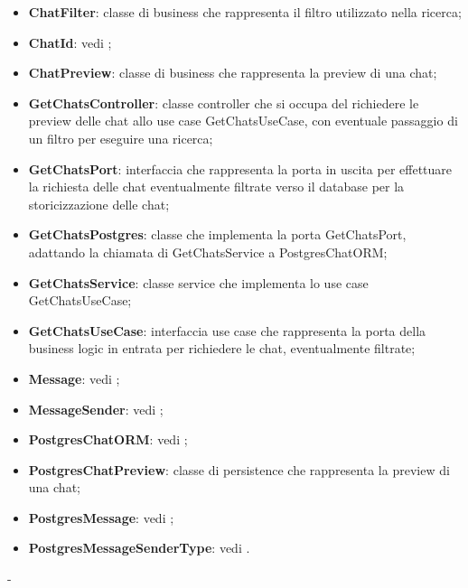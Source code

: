 \documentclass[10pt, a4paper]{article}
\begin{document}
\begin{itemize}
    \item \label{ChatFilter}\textbf{ChatFilter}: classe di business che rappresenta il filtro utilizzato nella ricerca;
    \item \textbf{ChatId}: vedi ;
    \item \label{ChatPreview}\textbf{ChatPreview}: classe di business che rappresenta la preview di una chat;
    \item \label{GetChatsController}\textbf{GetChatsController}: classe controller che si occupa del richiedere le preview delle chat allo use case GetChatsUseCase, con eventuale passaggio di un filtro per eseguire una ricerca;
    \item \label{GetChatsPort}\textbf{GetChatsPort}: interfaccia che rappresenta la porta in uscita per effettuare la richiesta delle chat eventualmente filtrate verso il database per la storicizzazione delle chat;
    \item \label{GetChatsPostgres}\textbf{GetChatsPostgres}: classe che implementa la porta GetChatsPort, adattando la chiamata di GetChatsService a PostgresChatORM;
    \item \label{GetChatsService}\textbf{GetChatsService}: classe service che implementa lo use case GetChatsUseCase;
    \item \label{GetChatsUseCase}\textbf{GetChatsUseCase}: interfaccia use case che rappresenta la porta della business logic in entrata per richiedere le chat, eventualmente filtrate;
    \item \textbf{Message}: vedi ;
    \item \textbf{MessageSender}: vedi ;
    \item \textbf{PostgresChatORM}: vedi ;
    \item \label{PostgresChatPreview}\textbf{PostgresChatPreview}: classe di persistence che rappresenta la preview di una chat;
    \item \textbf{PostgresMessage}: vedi ;
    \item \textbf{PostgresMessageSenderType}: vedi .
\end{itemize}


 -
\end{document}
